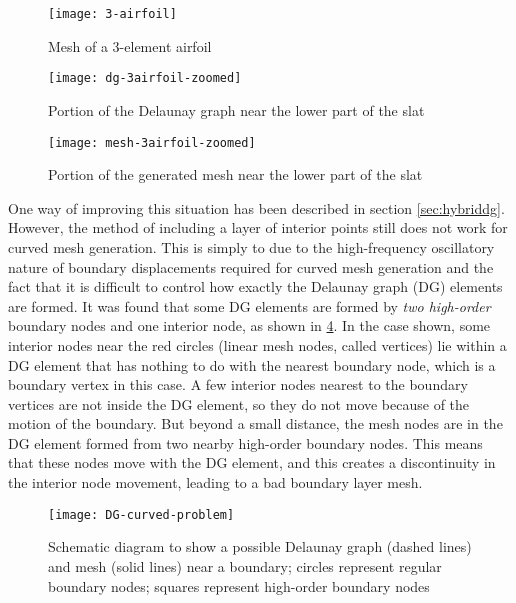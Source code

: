 \begin{figure}
	\centering
	\texttt{[image: 3-airfoil]}
	\caption{Mesh of a 3-element airfoil}
	\label{fig:wmesh}
\end{figure}
\begin{figure}
	\centering
	\texttt{[image: dg-3airfoil-zoomed]}
	\caption{Portion of the Delaunay graph near the lower part of the slat}
	\label{fig:wmesh-dg}
\end{figure}
\begin{figure}
	\centering
	\texttt{[image: mesh-3airfoil-zoomed]}
	\caption{Portion of the generated mesh near the lower part of the slat}
	\label{fig:wmesh-zoomed}
\end{figure}

One way of improving this situation has been described in section \ref{sec:hybriddg}. However, the method of including a layer of interior points still does not work for curved mesh generation. This is simply to due to the high-frequency oscillatory nature of boundary displacements required for curved mesh generation and the fact that it is difficult to control how exactly the Delaunay graph (DG) elements are formed. It was found that some DG elements are formed by \emph{two high-order} boundary nodes and one interior node, as shown in \ref{fig:dg-curved-problem}. In the case shown, some interior nodes near the red circles (linear mesh nodes, called vertices) lie within a DG element that has nothing to do with the nearest boundary node, which is a boundary vertex in this case. A few interior nodes nearest to the boundary vertices are not inside the DG element, so they do not move because of the motion of the boundary. But beyond a small distance, the mesh nodes are in the DG element formed from two nearby high-order boundary nodes. This means that these nodes move with the DG element, and this creates a discontinuity in the interior node movement, leading to a bad boundary layer mesh.
\begin{figure}[!h]
	\centering
	\texttt{[image: DG-curved-problem]}
	\caption{Schematic diagram to show a possible Delaunay graph (dashed lines) and mesh (solid lines) near a boundary; circles represent regular boundary nodes; squares represent high-order boundary nodes}
	\label{fig:dg-curved-problem}
\end{figure}